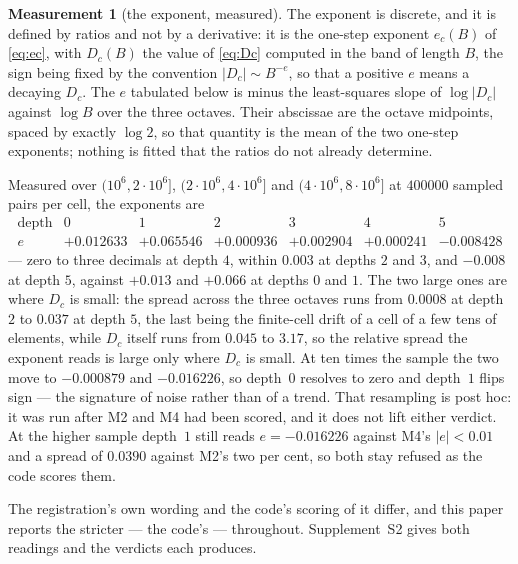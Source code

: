 \documentclass[11pt,a4paper]{article}
\theoremstyle{plain}
\theoremstyle{definition}
\newtheorem{measurement}[theorem]{Measurement}
\theoremstyle{remark}
\begin{document}
\begin{measurement}[the exponent, measured]\label{meas:scaleinv}
The exponent is discrete, and it is defined by ratios and not by a
derivative: it is the one-step exponent $e_c(B)$ of \eqref{eq:ec},
with $D_c(B)$ the value of \eqref{eq:Dc} computed in the band of
length $B$, the sign being fixed by the convention $|D_c|\sim B^{-e}$,
so that a positive $e$ means a decaying $D_c$. The $e$ tabulated below
is minus the least-squares slope of $\log|D_c|$ against $\log B$ over
the three
octaves. Their abscissae are the octave midpoints, spaced by exactly
$\log 2$, so that quantity is the mean of the two one-step exponents;
nothing is fitted that the ratios do not already determine.

Measured over $(10^6,2\cdot10^6]$, $(2\cdot10^6,4\cdot10^6]$ and
$(4\cdot10^6,8\cdot10^6]$ at $400000$ sampled pairs per cell, the
exponents are
\[
\begin{array}{r|cccccc}
 \text{depth} & 0 & 1 & 2 & 3 & 4 & 5\\\hline
 e & +0.012633 & +0.065546 & +0.000936 & +0.002904 & +0.000241
   & -0.008428
\end{array}
\]
--- zero to three decimals at depth $4$, within $0.003$ at depths $2$
and $3$, and $-0.008$ at depth $5$, against $+0.013$ and $+0.066$ at
depths $0$ and $1$. The two large ones are where $D_c$ is small: the
spread across the three octaves runs from $0.0008$ at depth $2$ to
$0.037$ at depth $5$, the last being the finite-cell drift of a
cell of a few tens of elements, while $D_c$
itself runs from $0.045$ to $3.17$, so the relative spread the exponent
reads is large only where $D_c$ is small. At ten times the sample the two
move to $-0.000879$ and $-0.016226$, so depth~$0$ resolves to zero and
depth~$1$ flips sign --- the signature of noise rather than of a trend.
That resampling is post hoc: it was run after M2 and M4 had been
scored, and it does not lift either verdict. At the higher sample
depth~$1$ still reads $e=-0.016226$ against M4's $|e|<0.01$ and a
spread of $0.0390$ against M2's two per cent, so both stay refused
as the code scores them.

The registration's own wording and the code's scoring of it differ, and
this paper reports the stricter --- the code's --- throughout.
Supplement~S2 gives both readings and the verdicts each produces.


\end{measurement}
\end{document}
